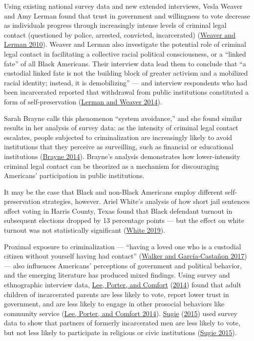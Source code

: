 \documentclass[
  12pt,
]{article}
\begin{document}
Using existing national survey data and new extended interviews, Vesla Weaver and Amy Lerman found that trust in government and willingness to vote decrease as individuals progress through increasingly intense levels of criminal legal contact (questioned by police, arrested, convicted, incarcerated) (\protect\hyperlink{ref-Weaver2010}{Weaver and Lerman 2010}). Weaver and Lerman also investigate the potential role of criminal legal contact in facilitating a collective racial political consciousness, or a ``linked fate'' of all Black Americans. Their interview data lead them to conclude that ``a custodial linked fate is not the building block of greater activism and a mobilized racial identity; instead, it is demobilizing'' --- and interview respondents who had been incarcerated reported that withdrawal from public institutions constituted a form of self-preservation (\protect\hyperlink{ref-Lerman2014}{Lerman and Weaver 2014}).

Sarah Brayne calls this phenomenon ``system avoidance,'' and she found similar results in her analysis of survey data: as the intensity of criminal legal contact escalates, people subjected to criminalization are increasingly likely to avoid institutions that they perceive as surveilling, such as financial or educational institutions (\protect\hyperlink{ref-Brayne2014}{Brayne 2014}). Brayne's analysis demonstrates how lower-intensity criminal legal contact can be theorized as a mechanism for discouraging Americans' participation in public institutions.

It may be the case that Black and non-Black Americans employ different self-preservation strategies, however. Ariel White's analysis of how short jail sentences affect voting in Harris County, Texas found that Black defendant turnout in subsequent elections dropped by 13 percentage points --- but the effect on white turnout was not statistically significant (\protect\hyperlink{ref-White2019}{White 2019}).

Proximal exposure to criminalization --- ``having a loved one who is a custodial citizen without yourself having had contact'' (\protect\hyperlink{ref-Walker2017}{Walker and García-Castañon 2017}) --- also influences Americans' perceptions of government and political behavior, and the emerging literature has produced mixed findings. Using survey and ethnographic interview data, \protect\hyperlink{ref-Lee2014}{Lee, Porter, and Comfort} (\protect\hyperlink{ref-Lee2014}{2014}) found that adult children of incarcerated parents are less likely to vote, report lower trust in government, and are less likely to engage in other prosocial behaviors like community service (\protect\hyperlink{ref-Lee2014}{Lee, Porter, and Comfort 2014}). \protect\hyperlink{ref-Sugie2015}{Sugie} (\protect\hyperlink{ref-Sugie2015}{2015}) used survey data to show that partners of formerly incarcerated men are less likely to vote, but not less likely to participate in religious or civic institutions (\protect\hyperlink{ref-Sugie2015}{Sugie 2015}).
\end{document}
